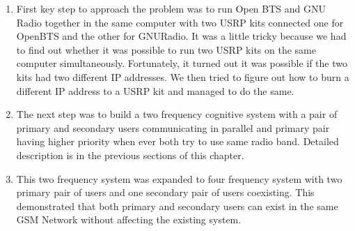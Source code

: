 \begin{enumerate}
\item  First key step to approach the problem was to run Open BTS and GNU 
Radio together in the same computer with two USRP kits connected one for 
OpenBTS and the other for GNURadio. It was a little tricky because we had to
find out whether it was possible to run two USRP kits on the same computer simultaneously.
Fortunately, it turned out it was possible if the two kits had two different IP addresses.
We then tried to figure out how to burn a different IP address to a USRP kit and
managed to do the same.
\item The next step was to build a two frequency cognitive system with a pair of 
primary and secondary users communicating in parallel and primary pair having 
higher priority when ever both try to use same radio band. Detailed description 
is in the previous sections of this chapter.
\item This two frequency system was expanded to four frequency system with two 
primary pair of users and one secondary pair of users coexisting. This 
demonstrated that both primary and secondary users can exist in the same GSM 
Network without affecting the existing system.
\end{enumerate}